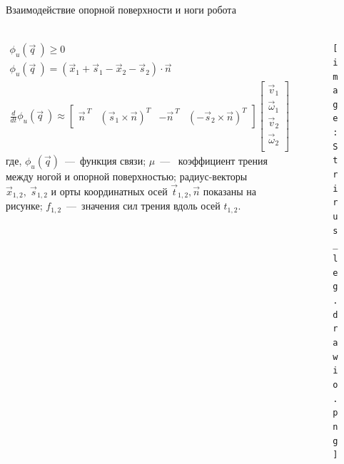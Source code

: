 \begin{frame}[t]{Взаимодействие опорной поверхности и ноги робота}
    \framesubtitle{}
    \begin{columns}[T,onlytextwidth]
        \begin{column}{0.64\textwidth}
            \begin{align}
                \phi_u(\vec{q}\ ) \geqslant 0                                                     \\
                \phi_u(\vec{q}\ ) = (\vec{x}_1 + \vec{s}_1 - \vec{x}_2 - \vec{s}_2) \cdot \vec{n} \\
                \frac{d }{d t}\phi_u(\vec{q}\ ) \approx \begin{bmatrix}
                                                            \vec{n}^{\ T} & (\vec{s}_1 \times \vec{n})^T & -\vec{n}^{\ T} & (-\vec{s}_2 \times \vec{n})^T
                                                        \end{bmatrix} \begin{bmatrix}
                                                                          \vec{v}_1      \\
                                                                          \vec{\omega}_1 \\
                                                                          \vec{v}_2      \\
                                                                          \vec{\omega}_2 \\
                                                                      \end{bmatrix}
            \end{align}
            где, $\phi_u(\vec{q})$~---~функция связи; $ \mu $~---~ коэффициент трения между ногой и опорной поверхностью;  радиус-векторы $\vec{x}_{1,2},\ \vec{s}_{1,2}$ и орты координатных осей $\vec{t}_{1,2}, \vec{n}$ показаны на рисунке; $ f_{1,2} $~---~значения сил трения вдоль осей $t_{1,2}$.
        \end{column}
        \begin{column}{0.35\textwidth}
            \vspace{-0.4cm}
            \begin{figure}[H]
                \centering\texttt{[image: Strirus\_leg.drawio.png]}
            \end{figure}
            \vspace{-1cm}
            \begin{align}

\end{align}
\end{column}
\end{columns}
\end{frame}
